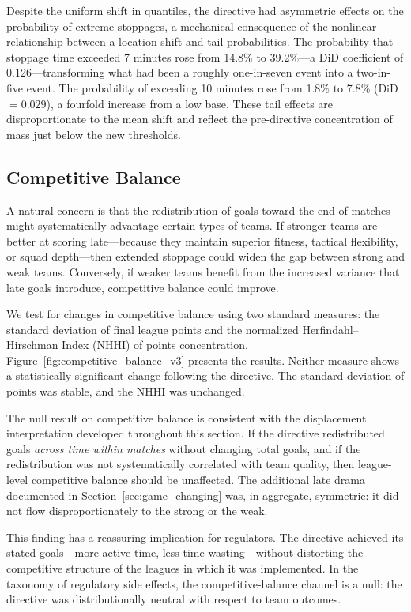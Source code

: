 Despite the uniform shift in quantiles, the directive had asymmetric effects on the probability of extreme stoppages, a mechanical consequence of the nonlinear relationship between a location shift and tail probabilities.  The probability that stoppage time exceeded 7 minutes rose from 14.8\% to 39.2\%---a DiD coefficient of 0.126---transforming what had been a roughly one-in-seven event into a two-in-five event.  The probability of exceeding 10 minutes rose from 1.8\% to 7.8\% (DiD $= 0.029$), a fourfold increase from a low base.  These tail effects are disproportionate to the mean shift and reflect the pre-directive concentration of mass just below the new thresholds.

\subsection{Competitive Balance}
\label{sec:competitive_balance}

A natural concern is that the redistribution of goals toward the end of matches might systematically advantage certain types of teams.  If stronger teams are better at scoring late---because they maintain superior fitness, tactical flexibility, or squad depth---then extended stoppage could widen the gap between strong and weak teams.  Conversely, if weaker teams benefit from the increased variance that late goals introduce, competitive balance could improve.

We test for changes in competitive balance using two standard measures: the standard deviation of final league points and the normalized Herfindahl--Hirschman Index (NHHI) of points concentration.  Figure~\ref{fig:competitive_balance_v3} presents the results.  Neither measure shows a statistically significant change following the directive.  The standard deviation of points was stable, and the NHHI was unchanged.

The null result on competitive balance is consistent with the displacement interpretation developed throughout this section.  If the directive redistributed goals \emph{across time within matches} without changing total goals, and if the redistribution was not systematically correlated with team quality, then league-level competitive balance should be unaffected.  The additional late drama documented in Section~\ref{sec:game_changing} was, in aggregate, symmetric: it did not flow disproportionately to the strong or the weak.

This finding has a reassuring implication for regulators.  The directive achieved its stated goals---more active time, less time-wasting---without distorting the competitive structure of the leagues in which it was implemented.  In the taxonomy of regulatory side effects, the competitive-balance channel is a null: the directive was distributionally neutral with respect to team outcomes.
